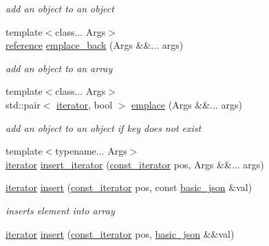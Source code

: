 \begin{DoxyCompactItemize}
\begin{DoxyCompactList}\small\item\em add an object to an object \end{DoxyCompactList}\item 
{\footnotesize template$<$class... Args$>$ }\\\hyperlink{classnlohmann_1_1basic__json_a220ae98554a76205fb7f8822d36b2d5a}{reference} \hyperlink{classnlohmann_1_1basic__json_a15c0a5db4fb12d49433801bbe6436bfb}{emplace\+\_\+back} (Args \&\&... args)
\begin{DoxyCompactList}\small\item\em add an object to an array \end{DoxyCompactList}\item 
{\footnotesize template$<$class... Args$>$ }\\std\+::pair$<$ \hyperlink{classnlohmann_1_1basic__json_aa549b2b382916b3baafb526e5cb410bd}{iterator}, bool $>$ \hyperlink{classnlohmann_1_1basic__json_ac479e609cbd03948bd3e85fb441b66e5}{emplace} (Args \&\&... args)
\begin{DoxyCompactList}\small\item\em add an object to an object if key does not exist \end{DoxyCompactList}\item 
{\footnotesize template$<$typename... Args$>$ }\\\hyperlink{classnlohmann_1_1basic__json_aa549b2b382916b3baafb526e5cb410bd}{iterator} \hyperlink{classnlohmann_1_1basic__json_ab5c8034e997c5b852b92bdc6a3f70994}{insert\+\_\+iterator} (\hyperlink{classnlohmann_1_1basic__json_aebd2cfa7e4ded4e97cde9269bfeeea38}{const\+\_\+iterator} pos, Args \&\&... args)
\item 
\hyperlink{classnlohmann_1_1basic__json_aa549b2b382916b3baafb526e5cb410bd}{iterator} \hyperlink{classnlohmann_1_1basic__json_aeb86e8478e20d95970a8b61ff01dce3b}{insert} (\hyperlink{classnlohmann_1_1basic__json_aebd2cfa7e4ded4e97cde9269bfeeea38}{const\+\_\+iterator} pos, const \hyperlink{classnlohmann_1_1basic__json}{basic\+\_\+json} \&val)
\begin{DoxyCompactList}\small\item\em inserts element into array \end{DoxyCompactList}\item 
\hyperlink{classnlohmann_1_1basic__json_aa549b2b382916b3baafb526e5cb410bd}{iterator} \hyperlink{classnlohmann_1_1basic__json_a9c5b9de8a4a759861cb600b38a6c81b1}{insert} (\hyperlink{classnlohmann_1_1basic__json_aebd2cfa7e4ded4e97cde9269bfeeea38}{const\+\_\+iterator} pos, \hyperlink{classnlohmann_1_1basic__json}{basic\+\_\+json} \&\&val)

\end{DoxyCompactItemize}
